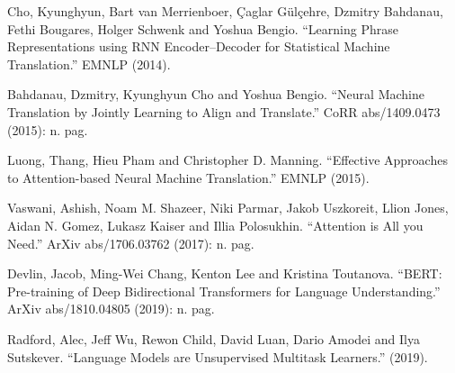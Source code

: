 \documentclass[11pt,dvipdfm]{article}
\begin{document}
\begin{thebibliography}{10}
\begin{small}
 Cho, Kyunghyun, Bart van Merrienboer, Çaglar Gülçehre, Dzmitry Bahdanau, Fethi Bougares, Holger Schwenk and Yoshua Bengio. “Learning Phrase Representations using RNN Encoder–Decoder for Statistical Machine Translation.” EMNLP (2014).

 Bahdanau, Dzmitry, Kyunghyun Cho and Yoshua Bengio. “Neural Machine Translation by Jointly Learning to Align and Translate.” CoRR abs/1409.0473 (2015): n. pag.

 Luong, Thang, Hieu Pham and Christopher D. Manning. “Effective Approaches to Attention-based Neural Machine Translation.” EMNLP (2015).

 Vaswani, Ashish, Noam M. Shazeer, Niki Parmar, Jakob Uszkoreit, Llion Jones, Aidan N. Gomez, Lukasz Kaiser and Illia Polosukhin. “Attention is All you Need.” ArXiv abs/1706.03762 (2017): n. pag.

 Devlin, Jacob, Ming-Wei Chang, Kenton Lee and Kristina Toutanova. “BERT: Pre-training of Deep Bidirectional Transformers for Language Understanding.” ArXiv abs/1810.04805 (2019): n. pag.

 Radford, Alec, Jeff Wu, Rewon Child, David Luan, Dario Amodei and Ilya Sutskever. “Language Models are Unsupervised Multitask Learners.” (2019).



\end{small}
\end{thebibliography}
\end{document}
